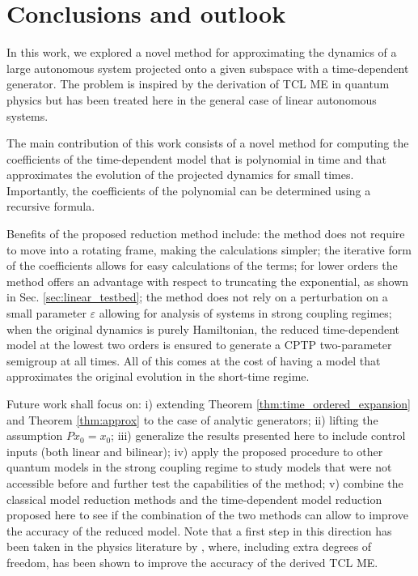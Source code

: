 \documentclass[10pt,aps,pra,twocolumn,showpacs,superscriptaddress,nobalancelastpage,notitlepage,nofootinbib,longbibliography]{revtex4-2}
\begin{document}
\section{Conclusions and outlook}
\label{sec:conclusion}

In this work, we explored a novel method for approximating the dynamics of a large autonomous system projected onto a given subspace with a time-dependent generator. The problem is inspired by the derivation of TCL ME in quantum physics but has been treated here in the general case of linear autonomous systems. 

The main contribution of this work consists of a novel method for computing the coefficients of the time-dependent model that is polynomial in time and that approximates the evolution of the projected dynamics for small times. Importantly, the coefficients of the polynomial can be determined using a recursive formula.  

Benefits of the proposed reduction method include: the method does not require to move into a rotating frame, making the calculations simpler; the iterative form of the coefficients allows for easy calculations of the terms; for lower orders the method offers an advantage with respect to truncating the exponential, as shown in Sec. \ref{sec:linear_testbed}; the method does not rely on a perturbation on a small parameter $\varepsilon$ allowing for analysis of systems in strong coupling regimes; when the original dynamics is purely Hamiltonian, the reduced time-dependent model at the lowest two orders is ensured to generate a CPTP two-parameter semigroup at all times. All of this comes at the cost of having a model that approximates the original evolution in the short-time regime. 

Future work shall focus on: 
i) extending Theorem \ref{thm:time_ordered_expansion} and Theorem \ref{thm:approx} to the case of analytic generators; 
ii) lifting the assumption $Px_0 =x_0$; 
iii) generalize the results presented here to include control inputs (both linear and bilinear);
iv) apply the proposed procedure to other quantum models in the strong coupling regime to study models that were not accessible before and further test the capabilities of the method; 
v) combine the classical model reduction methods and the time-dependent model reduction proposed here to see if the combination of the two methods can allow to improve the accuracy of the reduced model. Note that a first step in this direction has been taken in the physics literature by \cite{breuer2006,breuer2007}, where, including extra degrees of freedom, has been shown to improve the accuracy of the derived TCL ME.
\end{document}
